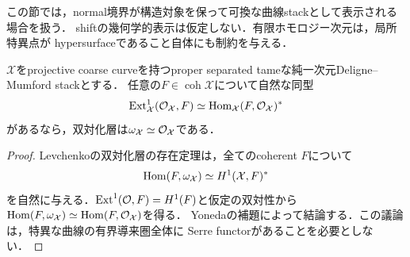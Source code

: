 \documentclass[11pt,a4paper]{ltjsarticle}
\begin{document}
この節では，normal境界が構造対象を保って可換な曲線stackとして表示される場合を扱う．
shiftの幾何学的表示は仮定しない．有限ホモロジー次元は，局所特異点が
hypersurfaceであること自体にも制約を与える．

\begin{lemma}[構造対象の双対性と双対化層]\label{lem:v7-dualizing-trivial}
$\mathcal X$をprojective coarse curveを持つproper separated tameな純一次元Deligne--Mumford stackとする．
任意の$F\in\operatorname{coh}\mathcal X$について自然な同型
\[
 \operatorname{Ext}^1_{\mathcal X}(\mathcal O_{\mathcal X},F)
 \simeq\operatorname{Hom}_{\mathcal X}(F,\mathcal O_{\mathcal X})^*
\]
があるなら，双対化層は$\omega_{\mathcal X}\simeq\mathcal O_{\mathcal X}$である．
\end{lemma}
\begin{proof}
Levchenkoの双対化層の存在定理\cite[Proposition 2]{Levchenko}は，全てのcoherent $F$について
\[
 \operatorname{Hom}(F,\omega_{\mathcal X})\simeq H^1(\mathcal X,F)^*
\]
を自然に与える．$\operatorname{Ext}^1(\mathcal O,F)=H^1(F)$と仮定の双対性から
$\operatorname{Hom}(F,\omega_{\mathcal X})\simeq\operatorname{Hom}(F,\mathcal O_{\mathcal X})$を得る．
Yonedaの補題によって結論する．この議論は，特異な曲線の有界導来圏全体に
Serre functorがあることを必要としない．
\end{proof}
\end{document}
